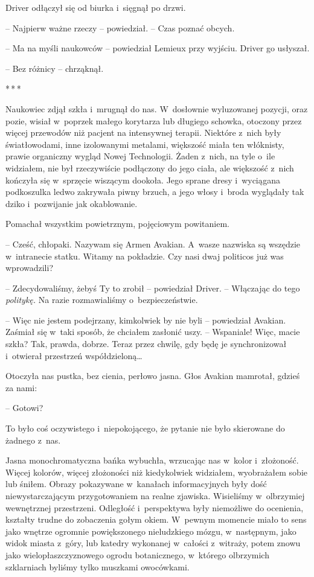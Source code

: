 \documentclass[oneside,polish,12pt,sfheadings]{mwbk}
\newcommand{\threeast}{\bigskip\par\centerline{*\,*\,*}\medskip\par}%
\begin{document}
Driver odłączył się od biurka i~sięgnął po drzwi.

-- Najpierw ważne rzeczy -- powiedział. -- Czas poznać obcych.

-- Ma na myśli naukowców -- powiedział Lemieux przy wyjściu. Driver go
usłyszał.

-- Bez różnicy -- chrząknął.

\threeast

Naukowiec zdjął szkła i~mrugnął do nas. W~dosłownie wyluzowanej pozycji,
oraz pozie, wisiał w~poprzek małego korytarza lub długiego schowka,
otoczony przez więcej przewodów niż pacjent na intensywnej terapii.
Niektóre z~nich były światłowodami, inne izolowanymi metalami, większość
miała ten włóknisty, prawie organiczny wygląd Nowej Technologii. Żaden z~nich, na tyle o~ile widziałem, nie był rzeczywiście podłączony do jego
ciała, ale większość z~nich kończyła się w~sprzęcie wiszącym dookoła.
Jego sprane dresy i~wyciągana podkoszulka ledwo zakrywała piwny brzuch,
a jego włosy i~broda wyglądały tak dziko i~pozwijanie jak okablowanie.

Pomachał wszystkim powietrznym, pojęciowym powitaniem.

-- Cześć, chłopaki. Nazywam się Armen Avakian. A~wasze nazwiska są
wszędzie w~intranecie statku. Witamy na pokładzie. Czy nasi dwaj
politicos już was wprowadzili?

-- Zdecydowaliśmy, żebyś Ty to zrobił -- powiedział Driver. -- Włączając do
tego \emph{politykę. } Na razie rozmawialiśmy o~bezpieczeństwie.

-- Więc nie jestem podejrzany, kimkolwiek by nie byli -- powiedział
Avakian. Zaśmiał się w~taki sposób, że chciałem zasłonić uszy. --
Wspaniale! Więc, macie szkła? Tak, prawda, dobrze. Teraz przez chwilę,
gdy będę je synchronizował i~otwierał przestrzeń współdzieloną\ldots

Otoczyła nas pustka, bez cienia, perłowo jasna. Głos Avakian mamrotał,
gdzieś za nami:

-- Gotowi?

To było coś oczywistego i~niepokojącego, że pytanie nie było skierowane
do żadnego z~nas.

Jasna monochromatyczna bańka wybuchła, wrzucając nas w~kolor i~złożoność. Więcej kolorów, więcej złożoności niż kiedykolwiek widziałem,
wyobrażałem sobie lub śniłem. Obrazy pokazywane w~kanałach
informacyjnych były dość niewystarczającym przygotowaniem na realne
zjawiska. Wisieliśmy w~olbrzymiej wewnętrznej przestrzeni. Odległość i~perspektywa były niemożliwe do ocenienia, kształty trudne do zobaczenia
gołym okiem. W~pewnym momencie miało to sens jako wnętrze ogromnie
powiększonego nieludzkiego mózgu, w~następnym, jako widok miasta z~góry,
lub katedry wykonanej w~całości z~witraży, potem znowu jako
wielopłaszczyznowego ogrodu botanicznego, w~którego olbrzymich
szklarniach byliśmy tylko muszkami owocówkami.
\end{document}
